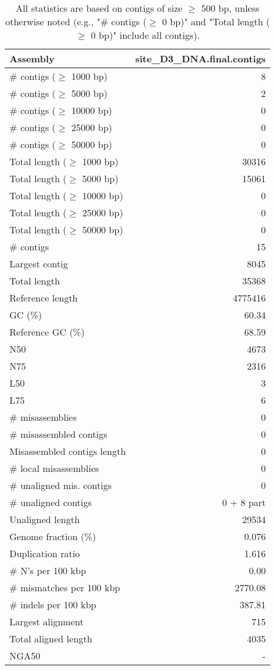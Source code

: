 \documentclass[12pt,a4paper]{article}
\begin{document}
\begin{table}[ht]
\begin{center}
\caption{All statistics are based on contigs of size $\geq$ 500 bp, unless otherwise noted (e.g., "\# contigs ($\geq$ 0 bp)" and "Total length ($\geq$ 0 bp)" include all contigs).}
\begin{tabular}{|l*{1}{|r}|}
\hline
Assembly & site\_D3\_DNA.final.contigs \\ \hline
\# contigs ($\geq$ 1000 bp) & 8 \\ \hline
\# contigs ($\geq$ 5000 bp) & 2 \\ \hline
\# contigs ($\geq$ 10000 bp) & 0 \\ \hline
\# contigs ($\geq$ 25000 bp) & 0 \\ \hline
\# contigs ($\geq$ 50000 bp) & 0 \\ \hline
Total length ($\geq$ 1000 bp) & 30316 \\ \hline
Total length ($\geq$ 5000 bp) & 15061 \\ \hline
Total length ($\geq$ 10000 bp) & 0 \\ \hline
Total length ($\geq$ 25000 bp) & 0 \\ \hline
Total length ($\geq$ 50000 bp) & 0 \\ \hline
\# contigs & 15 \\ \hline
Largest contig & 8045 \\ \hline
Total length & 35368 \\ \hline
Reference length & 4775416 \\ \hline
GC (\%) & 60.34 \\ \hline
Reference GC (\%) & 68.59 \\ \hline
N50 & 4673 \\ \hline
N75 & 2316 \\ \hline
L50 & 3 \\ \hline
L75 & 6 \\ \hline
\# misassemblies & 0 \\ \hline
\# misassembled contigs & 0 \\ \hline
Misassembled contigs length & 0 \\ \hline
\# local misassemblies & 0 \\ \hline
\# unaligned mis. contigs & 0 \\ \hline
\# unaligned contigs & 0 + 8 part \\ \hline
Unaligned length & 29534 \\ \hline
Genome fraction (\%) & 0.076 \\ \hline
Duplication ratio & 1.616 \\ \hline
\# N's per 100 kbp & 0.00 \\ \hline
\# mismatches per 100 kbp & 2770.08 \\ \hline
\# indels per 100 kbp & 387.81 \\ \hline
Largest alignment & 715 \\ \hline
Total aligned length & 4035 \\ \hline
NGA50 & - \\ \hline
\end{tabular}
\end{center}
\end{table}
\end{document}

